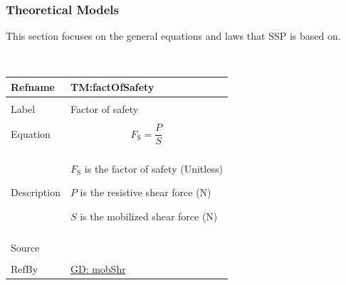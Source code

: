 \documentclass[12pt]{article}
\begin{document}
\subsubsection{Theoretical Models}
\label{Sec:TMs}
This section focuses on the general equations and laws that SSP is based on.
\par~

\noindent \begin{minipage}{\textwidth}
\begin{tabular}{>{\raggedright}p{}>{\raggedright\arraybackslash}p{}}
\toprule \textbf{Refname} & \textbf{TM:factOfSafety}
\label{TM:factOfSafety}
\\ \midrule \\
Label & Factor of safety
\\ \midrule \\
Equation & \begin{displaymath}
           {F_{\text{S}}}=\frac{P}{S}
           \end{displaymath}
\\ \midrule \\
Description & \begin{symbDescription}
              \item{${F_{\text{S}}}$ is the factor of safety (Unitless)}
              \item{$P$ is the resistive shear force (N)}
              \item{$S$ is the mobilized shear force (N)}
              \end{symbDescription}
\\ \midrule \\
Source & \cite{fredlund1977}
\\ \midrule \\
RefBy & \hyperref[GD:mobShr]{GD: mobShr}
\\ \bottomrule
\end{tabular}
\end{minipage}
\par~
\end{document}

